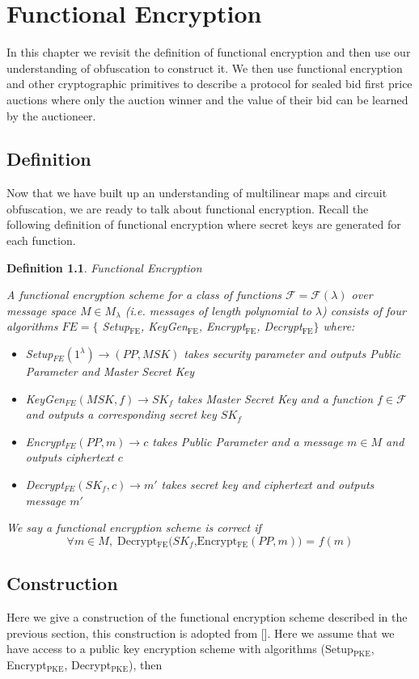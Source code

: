 \documentclass[12pt,twoside]{reedthesis}
\newtheorem{definition}{Definition}
\begin{document}
    \chapter{Functional Encryption}
    
    In this chapter we revisit the definition of functional encryption and then use our understanding of obfuscation to construct it. We then use functional encryption and other cryptographic primitives to describe a protocol for sealed bid first price auctions where only the auction winner and the value of their bid can be learned by the auctioneer.    
    \section{Definition}
    Now that we have built up an understanding of multilinear maps and circuit obfuscation, we are ready to talk about functional encryption. Recall the following definition of functional encryption where secret keys are generated for each function.
    \begin{definition}{Functional Encryption}
    \newcommand{\fe}[0]{_\text{FE}}
    \par A functional encryption scheme for a class of functions $\mathcal{F} = \mathcal{F}(\lambda)$ over message space $M \in M_\lambda$ (i.e. messages of length polynomial to $\lambda$) consists of four algorithms $FE = \{$ Setup$\fe$, KeyGen$\fe$, Encrypt$\fe$, Decrypt$\fe \}$ where:
    \begin{itemize}
    \item Setup$_{FE}(1^\lambda) \to (PP, MSK)$ takes security parameter and outputs Public Parameter and Master Secret Key 
    \item KeyGen$_{FE}(MSK,f)\to SK_f$ takes Master Secret Key and a function $f\in \mathcal{F}$ and outputs a corresponding secret key $SK_f$
    \item Encrypt$_{FE}(PP,m) \to c$ takes Public Parameter and a message $m\in M$ and outputs ciphertext $c$
    \item Decrypt$_{FE}(SK_f,c)\to m'$ takes secret key and ciphertext and outputs message $m'$
    \end{itemize}
    \par We say a functional encryption scheme is correct if $$\forall m \in M, \; \text{Decrypt$\fe(SK_f$,Encrypt$\fe(PP,m))$ = $f(m)$}$$
    \end{definition}
    
    \section{Construction}
    Here we give a construction of the functional encryption scheme described in the previous section, this construction is adopted from [\cite{Garg:2013}]. Here we assume that we have access to a public key encryption scheme with algorithms (Setup$_{\text{PKE}}$, Encrypt$_{\text{PKE}}$, Decrypt$_{\text{PKE}}$), then
    
\end{document}
